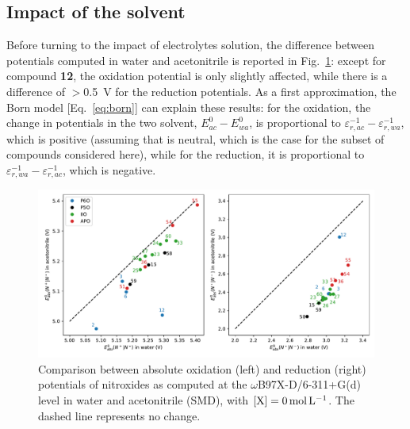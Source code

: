 \documentclass[review]{elsarticle}
\begin{document}
\subsection{Impact of the solvent}

Before turning to the impact of electrolytes solution, the difference between potentials computed in water and acetonitrile is reported in Fig.~\ref{fig:watvsac}: except for compound \textbf{12}, the oxidation potential is only slightly affected, while there is a difference of $>$\SI{0.5}{\volt} for the reduction potentials. As a first approximation, the Born model [Eq.~\eqref{eq:born}] can explain these results: for the oxidation, the change in potentials in the two solvent, $E^0_{ac} - E^0_{wa}$, is proportional to $ \varepsilon_{r,ac}^{-1}-\varepsilon_{r,wa}^{-1}$, which is positive (assuming that  is neutral, which is the case for the subset of compounds considered here), while for the reduction, it is proportional to $ \varepsilon_{r,wa}^{-1}-\varepsilon_{r,ac}^{-1}$, which is negative.

\begin{figure}[!h]
	\centering
	\includegraphics[width=\linewidth]{Figure7}
	\caption{Comparison between absolute oxidation (left) and reduction (right) potentials of nitroxides as computed at the $\omega$B97X-D/6-311+G(d) level in water and acetonitrile (SMD), with $[\ce{X}]=\SI{0}{\mole\per\liter}$. The dashed line represents no change. }
	\label{fig:watvsac}
\end{figure}
\end{document}

